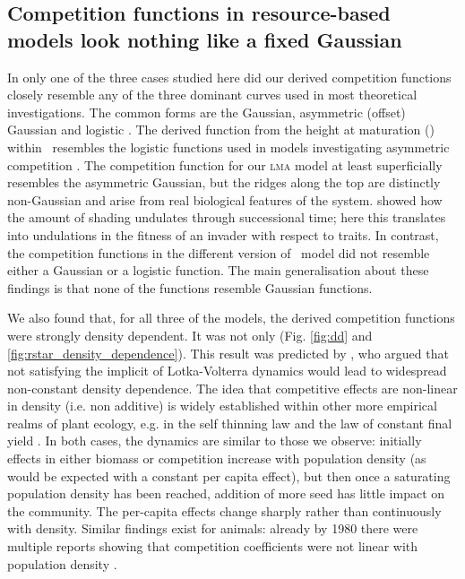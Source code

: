 \documentclass[a4paper,11pt]{article}
\begin{document}
\subsection{Competition functions in resource-based models look nothing like a fixed Gaussian}

In only one of the three cases studied here did our derived competition functions closely resemble any of the three dominant curves used in most theoretical investigations. The common forms are the Gaussian, asymmetric (offset) Gaussian \citep{Roughgarden-1979}
and logistic \citep[e.g.][]{Kisdi-1999, Law-1997}.
The derived function from the height at maturation (\hmat) within \plant\
resembles the logistic functions used in models investigating asymmetric competition \citep{Law-1997, Geritz-1999, Kisdi-1999,
  Calcagno-2006}.
%
The competition function for our \textsc{lma} model at least superficially resembles the asymmetric Gaussian, but the ridges along the top are distinctly non-Gaussian and arise from real biological features of the system.
%
\citet{Falster-2011} showed how the amount of shading undulates through successional time; here this translates into undulations in the fitness of an invader with respect to traits.
%
In contrast, the competition functions in the different version of \Rstar\ model did not resemble either a Gaussian or a logistic function.
%
The main generalisation about these findings is that none of the functions resemble Gaussian functions.

We also found that, for all three of the models, the derived competition functions were strongly density dependent. It was not only
(Fig. \ref{fig:dd} and \ref{fig:rstar_density_dependence}).
%
This result was predicted by \citet{Abrams-1980}, who argued that not satisfying the implicit of Lotka-Volterra dynamics would lead to widespread non-constant density dependence. The idea that competitive
effects are non-linear in density (i.e. non additive) is widely established within other more empirical realms of plant ecology, e.g.
in the self thinning law and the law of constant final yield \citep{Harper-1977}.
In both cases, the dynamics are similar to those we observe: initially effects in either biomass or competition increase with population density (as would be expected with a constant per capita effect), but then once a saturating population density has been reached, addition of more seed has little impact on the community. The per-capita effects change sharply rather than continuously with density. Similar findings exist for animals: already by 1980 there were multiple reports showing that competition coefficients were not linear with population density
\citep{Abrams-1980}.
\end{document}
